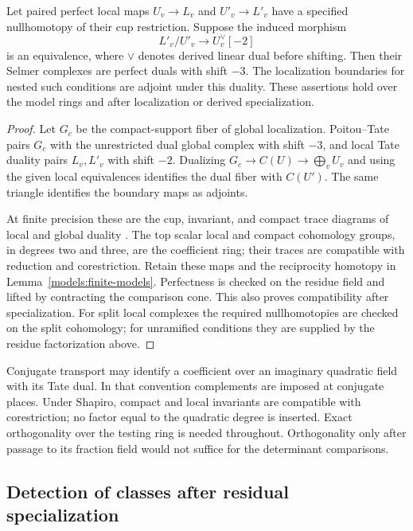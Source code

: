 \begin{lemma}\label{models:orthogonality}
Let paired perfect local maps $U_v\to L_v$ and $U'_v\to L'_v$ have
a specified nullhomotopy of their cup restriction.  Suppose the
induced morphism
\[
 L'_v/U'_v\longrightarrow U_v^\vee[-2]
\]
is an equivalence, where $\vee$ denotes derived linear dual before
shifting.  Then their Selmer complexes are perfect duals with shift
$-3$.  The localization boundaries for nested such conditions are
adjoint under this duality.  These assertions hold over the model
rings and after localization or derived specialization.
\end{lemma}

\begin{proof}
Let $G_c$ be the compact-support fiber of global localization.
Poitou--Tate pairs $G_c$ with the unrestricted dual global complex
with shift $-3$, and local Tate duality pairs $L_v,L'_v$ with shift
$-2$.  Dualizing $G_c\to C(U)\to\bigoplus_vU_v$ and using the given
local equivalences identifies the dual fiber with $C(U')$.  The same
triangle identifies the boundary maps as adjoints.

At finite precision these are the cup, invariant, and compact trace
diagrams of local and global duality \cite{Milne,Nekovar}.  The top
scalar local and compact cohomology groups, in degrees two and three,
are the coefficient ring; their traces are compatible with reduction
and corestriction.  Retain these maps and the reciprocity homotopy in
Lemma~\ref{models:finite-models}.  Perfectness is checked on the
residue field and lifted by contracting the comparison cone.  This
also proves compatibility after specialization.  For split local
complexes the required nullhomotopies are checked on the split
cohomology; for unramified conditions they are supplied by the residue
factorization above.
\end{proof}

Conjugate transport may identify a coefficient over an imaginary
quadratic field with its Tate dual.  In that convention complements
are imposed at conjugate places.  Under Shapiro, compact and local
invariants are compatible with corestriction; no factor equal to the
quadratic degree is inserted.  Exact orthogonality over the testing
ring is needed throughout.  Orthogonality only after passage to its
fraction field would not suffice for the determinant comparisons.

\subsection{Detection of classes after residual specialization}

